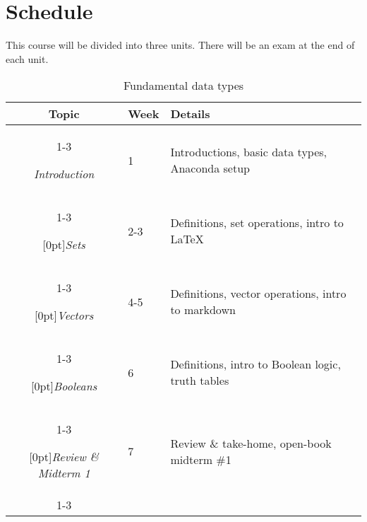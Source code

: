 \documentclass[10pt]{memoir}
\begin{document}
\clearpage

\section{\textbf{Schedule}}

This course will be divided into three units. There will be an exam at the end of each unit. \\

\begin{table}[htb!]
\centering
\begin{tabular}{cll}
    \textbf{Topic} & \textbf{Week} &  \textbf{Details} \\
    \cmidrule[.1em](lr){1-3}
    
    \textit{Introduction} & 1 & Introductions, basic data types, Anaconda setup \\
    \cmidrule[.1em](lr){1-3} 
 
     \multirow{1}{*}[0pt]{\textit{Sets}} %
        & 2-3 &  Definitions, set operations, intro to \LaTeX \\ 
        \cmidrule[.1em](lr){1-3}
        
    \multirow{1}{*}[0pt]{\textit{Vectors}} %
        & 4-5 & Definitions, vector operations, intro to markdown \\ \cmidrule[.1em](lr){1-3}

    \multirow{1}{*}[0pt]{\textit{Booleans}} %
        & 6 & Definitions, intro to Boolean logic, truth tables \\   \cmidrule[.1em](lr){1-3}    

   \multirow{1}{*}[0pt]{\textit{Review \& Midterm 1}} %
        & 7 & Review \& take-home, open-book midterm \#1 \\ \cmidrule[.1em](lr){1-3}             

\end{tabular}\\
\caption{Fundamental data types}
\end{table}

\end{document}
